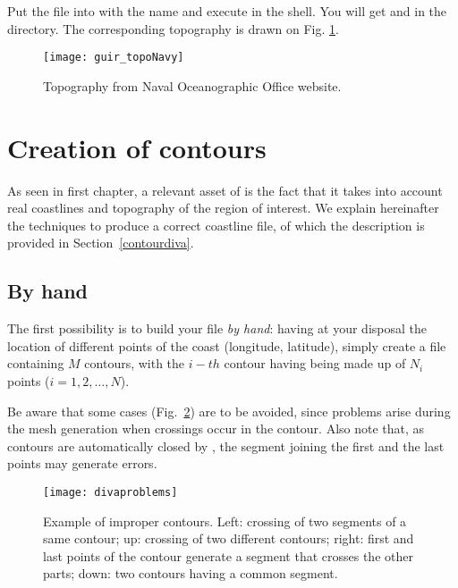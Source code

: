 Put the  file into  with the name  and execute  in the shell. You will get  and  in the  directory. The corresponding topography is drawn on Fig. \ref{fig:topoNaval}.


\begin{figure}[htpb]
\centering
\texttt{[image: guir\_topoNavy]}
\caption{Topography from Naval Oceanographic Office website.\label{fig:topoNaval}}
\end{figure}




\section{Creation of contours\label{sec:contourgen}}

As seen in first chapter, a relevant asset of \diva is the fact that it takes into account real coastlines and topography of the region of interest. We explain hereinafter the techniques to produce a correct coastline file, of which the description is provided in Section~\ref{contourdiva}.


\subsection{By hand}

The first possibility is to build your file \textit{by hand}: having at your disposal the location of different points of the coast (longitude, latitude), simply create a file containing $M$ contours, with the $i-th$ contour having being made up of $N_{i}$ points ($i=1,2,\ldots, N$). 

Be aware that some cases (Fig.~\ref{divaprob}) are to be avoided, since problems arise during the mesh generation when crossings occur in the contour. Also note that, as contours are automatically closed by \diva, the segment joining the first and the last points may generate errors. 


\begin{figure}[H]
\centering
\parbox{.5\textwidth}{
\texttt{[image: divaproblems]}
}\parbox{.5\textwidth}{\caption[Example of improper contours.]{Example of improper contours. Left: crossing of two segments of a same contour; up: crossing of two different contours; right: first and last points of the contour generate a segment that crosses the other parts; down: two contours having a common segment.\label{divaprob}}
}
\end{figure}

